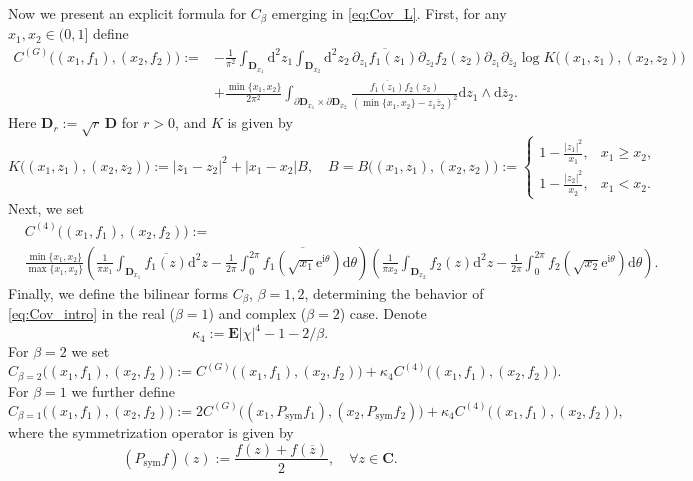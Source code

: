 \documentclass[10pt]{amsart}
\numberwithin{equation}{section}
\newcommand{\dif}{\mathrm{d}}
\newcommand{\E}{\mathbf{E}}
\newcommand{\C}{\mathbf{C}}
\newcommand{\DD}{\mathbf{D}}
\newcommand{\ii}{\mathrm{i}}
\newcommand{\ee}{\mathrm{e}}
\begin{document}
Now we present an explicit formula for $C_\beta$ emerging in \eqref{eq:Cov_L}. First, for any $x_1,x_2\in (0,1]$ define 
\begin{equation}
\begin{split}
C^{(G)}\big((x_1,f_1), (x_2,f_2)\big):= &-\frac{1}{\pi^2}\int_{\DD_{x_1}}\!\!\!\!\dif^2 z_1\int_{\DD_{x_2}}\!\!\!\!\dif^2 z_2 \, \overline{\partial_{z_1} f_1(z_1)}\partial_{z_2} f_2(z_2) \partial_{z_1}\partial_{\overline{z}_2} \log K\big((x_1,z_1),(x_2,z_2)\big)\\
&+\frac{\min\{x_1,x_2\}}{2\pi^2}\int_{\partial \DD_{x_1}\times \partial \DD_{x_2}} \frac{\overline{f_1(z_1)}f_2(z_2)}{\left(\min\{x_1,x_2\}-z_1\overline{z}_2\right)^2}\dif z_1\wedge\dif \overline{z}_2.
\end{split}
\label{eq:C_Gauss}
\end{equation}
Here $\DD_r:=\sqrt{r}\, \DD$ for $r>0$, and
 $K$ is given by
\begin{equation}
K\big((x_1,z_1),(x_2,z_2)\big):= |z_1-z_2|^2 + |x_1-x_2|B,\quad B=B\big((x_1,z_1),(x_2,z_2)\big):=\begin{cases}
1-\frac{|z_1|^2}{x_1},& x_1\ge x_2,\\
1-\frac{|z_2|^2}{x_2},&x_1<x_2.
\end{cases}
\label{eq:def_K}
\end{equation}
Next, we set
\begin{equation}
\begin{split}
&C^{(4)}\big((x_1,f_1), (x_2,f_2)\big):=\\
&\frac{\min\{x_1,x_2\}}{\max\{x_1,x_2\}}\!\!\left(\!\frac{1}{\pi x_1}\int_{\DD_{x_1}}\!\!\!\!\overline{f_1(z)}\dif^2 z-\frac{1}{2\pi}\int_0^{2\pi}\!\!\overline{f_1(\sqrt{x_1}\ee^{\ii\theta})}\dif\theta\!\right)\!\!\!\left(\!\frac{1}{\pi x_2}\int_{\DD_{x_2}}\!\!\!\!f_2(z)\dif^2 z-\frac{1}{2\pi}\int_0^{2\pi}\!\!f_2(\sqrt{x_2}\ee^{\ii\theta})\dif\theta\!\right)\!.
\end{split}
\label{eq:C_4}
\end{equation}
Finally, we define the bilinear forms $C_\beta$, $\beta=1,2$, determining the behavior of \eqref{eq:Cov_intro} in the real ($\beta=1$) and complex ($\beta=2$) case. Denote
\begin{equation}
\kappa_4:=\E|\chi|^4-1-2/\beta.
\label{eq:def_kappa_4}
\end{equation}
For $\beta=2$ we set 
\begin{equation}
C_{\beta=2}\big((x_1,f_1),(x_2,f_2)\big) := C^{(G)}\big((x_1,f_1),(x_2,f_2)\big) + \kappa_4 C^{(4)}\big((x_1,f_1),(x_2,f_2)\big).
\label{eq:C_beta_2}
\end{equation}
For $\beta=1$ we further define
\begin{equation}
C_{\beta=1}\big((x_1,f_1),(x_2,f_2)\big) := 2C^{(G)}\big((x_1,P_\mathrm{sym}f_1),(x_2,P_\mathrm{sym}f_2)\big) + \kappa_4 C^{(4)}\big((x_1,f_1),(x_2,f_2)\big),
\label{eq:C_beta_1}
\end{equation}
where the symmetrization operator is given by
\begin{equation}
\left(P_{\mathrm{sym}}f\right)(z):=\frac{f(z)+f(\overline{z})}{2},\quad \forall z\in\C.
\label{eq:P_sym}
\end{equation}
\end{document}
